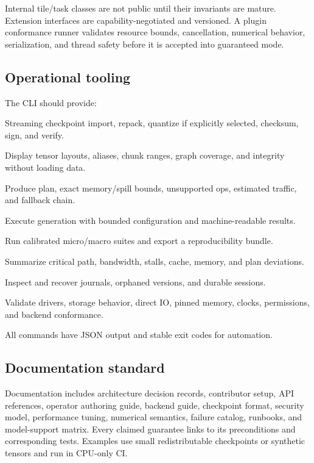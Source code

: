Internal tile/task classes are not public until their invariants are mature. Extension interfaces are capability-negotiated and versioned. A plugin conformance runner validates resource bounds, cancellation, numerical behavior, serialization, and thread safety before it is accepted into guaranteed mode.

\subsection{Operational tooling}

The CLI should provide:

\begin{description}[leftmargin=3.5cm,style=nextline]
  \item[\code{ams convert}] Streaming checkpoint import, repack, quantize if explicitly selected, checksum, sign, and verify.
  \item[\code{ams inspect}] Display tensor layouts, aliases, chunk ranges, graph coverage, and integrity without loading data.
  \item[\code{ams preflight}] Produce plan, exact memory/spill bounds, unsupported ops, estimated traffic, and fallback chain.
  \item[\code{ams run}] Execute generation with bounded configuration and machine-readable results.
  \item[\code{ams benchmark}] Run calibrated micro/macro suites and export a reproducibility bundle.
  \item[\code{ams trace}] Summarize critical path, bandwidth, stalls, cache, memory, and plan deviations.
  \item[\code{ams recover}] Inspect and recover journals, orphaned versions, and durable sessions.
  \item[\code{ams doctor}] Validate drivers, storage behavior, direct IO, pinned memory, clocks, permissions, and backend conformance.
\end{description}

All commands have JSON output and stable exit codes for automation.

\subsection{Documentation standard}

Documentation includes architecture decision records, contributor setup, API references, operator authoring guide, backend guide, checkpoint format, security model, performance tuning, numerical semantics, failure catalog, runbooks, and model-support matrix. Every claimed guarantee links to its preconditions and corresponding tests. Examples use small redistributable checkpoints or synthetic tensors and run in CPU-only CI.

